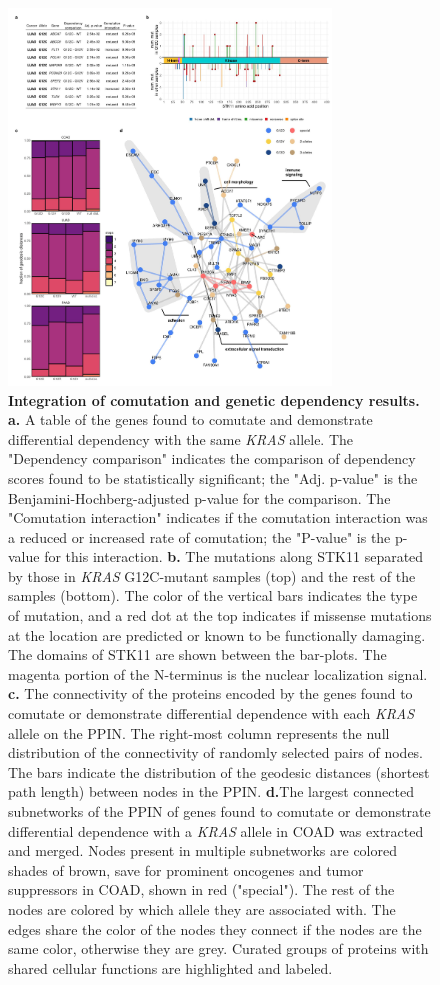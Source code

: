 \documentclass[english, 10pt, letterpaper]{article}
\newcommand{\KRAS}{\emph{KRAS}}
\begin{document}
\begin{figure}[p]
\centering
\includegraphics[height=100mm]{figures/Fig_6.jpeg}
\caption{
    \textbf{Integration of comutation and genetic dependency results.}
    \textbf{a.} A table of the genes found to comutate and demonstrate differential dependency with the same \KRAS{} allele. The "Dependency comparison" indicates the comparison of dependency scores found to be statistically significant; the "Adj. p-value" is the Benjamini-Hochberg-adjusted p-value for the comparison. The "Comutation interaction" indicates if the comutation interaction was a reduced or increased rate of comutation; the "P-value" is the p-value for this interaction.
    \textbf{b.} The mutations along STK11 separated by those in \KRAS{} G12C-mutant samples (top) and the rest of the samples (bottom). The color of the vertical bars indicates the type of mutation, and a red dot at the top indicates if missense mutations at the location are predicted or known to be functionally damaging. The domains of STK11 are shown between the bar-plots. The magenta portion of the N-terminus is the nuclear localization signal.
    \textbf{c.} The connectivity of the proteins encoded by the genes found to comutate or demonstrate differential dependence with each \KRAS{} allele on the PPIN. The right-most column represents the null distribution of the connectivity of randomly selected pairs of nodes. The bars indicate the distribution of the geodesic distances (shortest path length) between nodes in the PPIN.
    \textbf{d.}The largest connected subnetworks of the PPIN of genes found to comutate or demonstrate differential dependence with a \KRAS{} allele in COAD was extracted and merged. Nodes present in multiple subnetworks are colored shades of brown, save for prominent oncogenes and tumor suppressors in COAD, shown in red ("special"). The rest of the nodes are colored by which allele they are associated with. The edges share the color of the nodes they connect if the nodes are the same color, otherwise they are grey. Curated groups of proteins with shared cellular functions are highlighted and labeled.
}
\label{fig:results-integration-main}
\end{figure}
\end{document}
